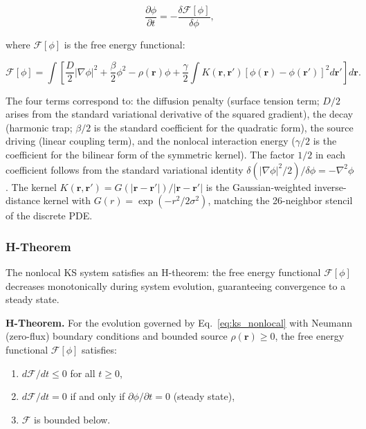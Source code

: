 \documentclass[sn-nature,pdflatex]{sn-jnl}
\begin{document}
\begin{equation}
\label{eq:gradient_flow}
\frac{\partial \phi}{\partial t} = -\frac{\delta \mathcal{F}[\phi]}{\delta \phi},
\end{equation}

where $\mathcal{F}[\phi]$ is the free energy functional:

\begin{equation}
\label{eq:free_energy}
\mathcal{F}[\phi] = \int \left[ \frac{D}{2}|\nabla \phi|^2 + \frac{\beta}{2}\phi^2 - \rho(\mathbf{r})\phi + \frac{\gamma}{2} \int K(\mathbf{r}, \mathbf{r}')[\phi(\mathbf{r}) - \phi(\mathbf{r}')]^2 d\mathbf{r}' \right] d\mathbf{r}.
\end{equation}

The four terms correspond to: the diffusion penalty (surface tension term; $D/2$ arises from the standard variational derivative of the squared gradient), the decay (harmonic trap; $\beta/2$ is the standard coefficient for the quadratic form), the source driving (linear coupling term), and the nonlocal interaction energy ($\gamma/2$ is the coefficient for the bilinear form of the symmetric kernel). The factor $1/2$ in each coefficient follows from the standard variational identity $\delta(|\nabla\phi|^2/2)/\delta\phi = -\nabla^2\phi$.
The kernel $K(\mathbf{r}, \mathbf{r}') = G(|\mathbf{r}-\mathbf{r}'|)/|\mathbf{r}-\mathbf{r}'|$ is the Gaussian-weighted inverse-distance kernel with $G(r)=\exp(-r^2/2\sigma^2)$, matching the 26-neighbor stencil of the discrete PDE.

\subsubsection{H-Theorem}

The nonlocal KS system satisfies an H-theorem: the free energy functional $\mathcal{F}[\phi]$ decreases monotonically during system evolution, guaranteeing convergence to a steady state.

\textbf{H-Theorem.} For the evolution governed by Eq.~\eqref{eq:ks_nonlocal} with Neumann (zero-flux) boundary conditions and bounded source $\rho(\mathbf{r}) \geq 0$, the free energy functional $\mathcal{F}[\phi]$ satisfies:
\begin{enumerate}
  \item[(a)] $d\mathcal{F}/dt \leq 0$ for all $t \geq 0$,
  \item[(b)] $d\mathcal{F}/dt = 0$ if and only if $\partial\phi/\partial t = 0$ (steady state),
  \item[(c)] $\mathcal{F}$ is bounded below.
\end{enumerate}
\end{document}
